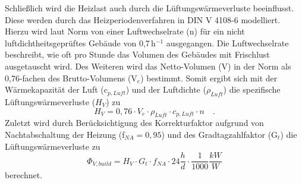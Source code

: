 Schließlich wird die Heizlast auch durch die Lüftungswärmeverluste beeinflusst.
Diese werden durch das Heizperiodenverfahren in DIN V 4108-6 modelliert.
Hierzu wird laut Norm von einer Luftwechselrate (n) für ein nicht luftdichtheitsgeprüftes Gebäude von 0,7\,h\(^{-1}\) ausgegangen. 
Die Luftwechselrate beschreibt, wie oft pro Stunde das Volumen des Gebäudes mit Frischlust ausgetauscht wird.
Des Weiteren wird das Netto-Volumen (V) in der Norm als 0,76-fachen des Brutto-Volumens (V\(_e\)) bestimmt.
Somit ergibt sich mit der Wärmekapazität der Luft (c\(_{p, Luft}\)) und der Luftdichte (\(\rho_{Luft}\)) die spezifische Lüftungswärmeverluste (\(H_V\)) zu
\begin{equation}
\label{eq:Gleichung2628}
H_V = 0,76 \cdot V_e \cdot \rho_{Luft} \cdot c_{p, Luft} \cdot n \quad \text{.}
\end{equation}
Zuletzt wird durch Berücksichtigung des Korrekturfaktor aufgrund von Nachtabschaltung der Heizung (f\(_{NA} = 0,95\)) und des Gradtagzahlfaktor (G\(_t\)) die Lüftungswärmeverluste zu
\begin{equation}
\label{eq:Gleichung2629}
\Phi_{V, build} = H_V \cdot G_t \cdot f_{NA} \cdot 24 \frac{h}{d} \cdot \frac{1}{1000} \frac{kW}{W} 
\end{equation}
berechnet.
